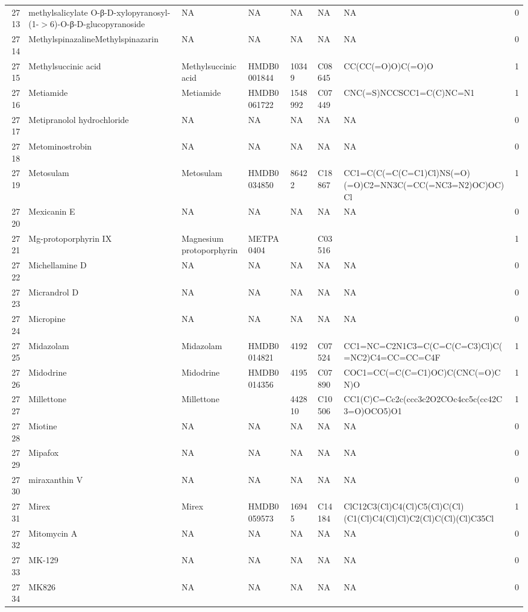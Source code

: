 \documentclass[a4paper]{article}
\begin{document}
\begin{longtable}{rlllllll}
  2713 & methylsalicylate O-β-D-xylopyranosyl-(1-$>$6)-O-β-D-glucopyranoside & NA & NA & NA & NA & NA & 0 \\ 
  2714 & MethylspinazalineMethylspinazarin & NA & NA & NA & NA & NA & 0 \\ 
  2715 & Methylsuccinic acid & Methylsuccinic acid & HMDB0001844 & 10349 & C08645 & CC(CC(=O)O)C(=O)O & 1 \\ 
  2716 & Metiamide & Metiamide & HMDB0061722 & 1548992 & C07449 & CNC(=S)NCCSCC1=C(C)NC=N1 & 1 \\ 
  2717 & Metipranolol hydrochloride & NA & NA & NA & NA & NA & 0 \\ 
  2718 & Metominostrobin & NA & NA & NA & NA & NA & 0 \\ 
  2719 & Metosulam & Metosulam & HMDB0034850 & 86422 & C18867 & CC1=C(C(=C(C=C1)Cl)NS(=O)(=O)C2=NN3C(=CC(=NC3=N2)OC)OC)Cl & 1 \\ 
  2720 & Mexicanin E & NA & NA & NA & NA & NA & 0 \\ 
  2721 & Mg-protoporphyrin IX & Magnesium protoporphyrin & METPA0404 &  & C03516 &  & 1 \\ 
  2722 & Michellamine D & NA & NA & NA & NA & NA & 0 \\ 
  2723 & Micrandrol D & NA & NA & NA & NA & NA & 0 \\ 
  2724 & Micropine & NA & NA & NA & NA & NA & 0 \\ 
  2725 & Midazolam & Midazolam & HMDB0014821 & 4192 & C07524 & CC1=NC=C2N1C3=C(C=C(C=C3)Cl)C(=NC2)C4=CC=CC=C4F & 1 \\ 
  2726 & Midodrine & Midodrine & HMDB0014356 & 4195 & C07890 & COC1=CC(=C(C=C1)OC)C(CNC(=O)CN)O & 1 \\ 
  2727 & Millettone & Millettone &  & 442810 & C10506 & CC1(C)C=Cc2c(ccc3c2O2COc4cc5c(cc42C3=O)OCO5)O1 & 1 \\ 
  2728 & Miotine & NA & NA & NA & NA & NA & 0 \\ 
  2729 & Mipafox & NA & NA & NA & NA & NA & 0 \\ 
  2730 & miraxanthin V & NA & NA & NA & NA & NA & 0 \\ 
  2731 & Mirex & Mirex & HMDB0059573 & 16945 & C14184 & ClC12C3(Cl)C4(Cl)C5(Cl)C(Cl)(C1(Cl)C4(Cl)Cl)C2(Cl)C(Cl)(Cl)C35Cl & 1 \\ 
  2732 & Mitomycin A & NA & NA & NA & NA & NA & 0 \\ 
  2733 & MK-129 & NA & NA & NA & NA & NA & 0 \\ 
  2734 & MK826 & NA & NA & NA & NA & NA & 0 \\ 

\end{longtable}
\end{document}
